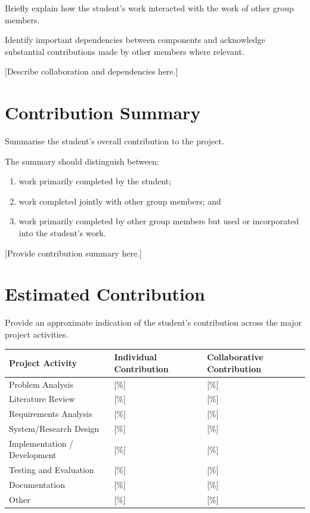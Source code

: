 \documentclass[12pt,a4paper]{report}
\begin{document}
Briefly explain how the student's work interacted with the work of other group members.

Identify important dependencies between components and acknowledge substantial contributions made by other members where relevant.

[Describe collaboration and dependencies here.]

\section{Contribution Summary}

Summarise the student's overall contribution to the project.

The summary should distinguish between:

\begin{enumerate}
    \item work primarily completed by the student;
    \item work completed jointly with other group members; and
    \item work primarily completed by other group members but used or incorporated into the student's work.
\end{enumerate}

[Provide contribution summary here.]
\newpage
\section{Estimated Contribution}

Provide an approximate indication of the student's contribution across the major project activities.

\begin{table}[H]
\centering
\begin{tabular}{p{}p{}p{}}
\toprule
\textbf{Project Activity} & \textbf{Individual Contribution} & \textbf{Collaborative Contribution} \\
\midrule
Problem Analysis & [\%] & [\%] \\
Literature Review & [\%] & [\%] \\
Requirements Analysis & [\%] & [\%] \\
System/Research Design & [\%] & [\%] \\
Implementation / Development & [\%] & [\%] \\
Testing and Evaluation & [\%] & [\%] \\
Documentation & [\%] & [\%] \\
Other & [\%] & [\%] \\
\bottomrule
\end{tabular}
\end{table}
\end{document}
